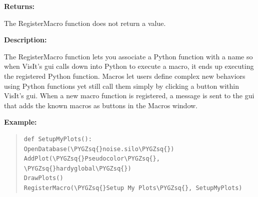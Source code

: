 \documentclass[letterpaper,10pt,english]{sphinxmanual}
\def\PYGZsq{\char`\'}
\renewcommand\PYGZsq{\textquotesingle}
\begin{document}
\begin{DUlineblock}{0em}
\item[] 
\item[] \textbf{Returns:}
\item[] The RegisterMacro function does not return a value.
\item[] 
\item[] \textbf{Description:}
\item[] The RegisterMacro function lets you associate a Python function with a name
so when VisIt's gui calls down into Python to execute a macro, it ends up
executing the registered Python function. Macros let users define complex
new behaviors using Python functions yet still call them simply by clicking
a button within VisIt's gui. When a new macro function is registered, a
message is sent to the gui that adds the known macros as buttons in the
Macros window.
\end{DUlineblock}

\begin{DUlineblock}{0em}
\item[] 
\end{DUlineblock}

\begin{DUlineblock}{0em}
\item[] \textbf{Example:}
\item[] 
\end{DUlineblock}
\begin{quote}

\begin{Verbatim}[commandchars=\\\{\}]
def SetupMyPlots():
OpenDatabase(\PYGZsq{}noise.silo\PYGZsq{})
AddPlot(\PYGZsq{}Pseudocolor\PYGZsq{}, \PYGZsq{}hardyglobal\PYGZsq{})
DrawPlots()
RegisterMacro(\PYGZsq{}Setup My Plots\PYGZsq{}, SetupMyPlots)
\end{Verbatim}
\end{quote}
\end{document}
